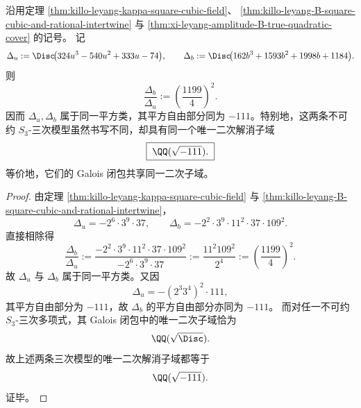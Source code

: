 \begin{corollary}[分支立方域与振幅平方立方域的共同二次解消子域与判别式平方比]\label{cor:xi-leyang-u-b-square-common-quadratic-resolvent}
沿用定理 \ref{thm:killo-leyang-kappa-square-cubic-field}、
\ref{thm:killo-leyang-B-square-cubic-and-rational-intertwine} 与
\ref{thm:xi-leyang-amplitude-B-true-quadratic-cover} 的记号。
记
\[
\Delta_u:=\Disc\!\bigl(324u^3-540u^2+333u-74\bigr),
\qquad
\Delta_b:=\Disc\!\bigl(162b^3+1593b^2+1998b+1184\bigr).
\]
则
\[
\frac{\Delta_b}{\Delta_u}
:=
\left(\frac{1199}{4}\right)^2.
\]
因而 \(\Delta_u,\Delta_b\) 属于同一平方类，其平方自由部分同为
\(-111\)。特别地，这两条不可约 \(S_3\)-三次模型虽然书写不同，却具有同一个唯一二次解消子域
\[
\boxed{\;
\QQ(\sqrt{-111}).\;}
\]
等价地，它们的 Galois 闭包共享同一二次子域。
\end{corollary}
\begin{proof}
由定理 \ref{thm:killo-leyang-kappa-square-cubic-field} 与
\ref{thm:killo-leyang-B-square-cubic-and-rational-intertwine}，
\[
\Delta_u=-2^{6}\cdot 3^{9}\cdot 37,
\qquad
\Delta_b=-2^{2}\cdot 3^{9}\cdot 11^{2}\cdot 37\cdot 109^{2}.
\]
直接相除得
\[
\frac{\Delta_b}{\Delta_u}
:=
\frac{-2^{2}\cdot 3^{9}\cdot 11^{2}\cdot 37\cdot 109^{2}}
{-2^{6}\cdot 3^{9}\cdot 37}
:=
\frac{11^{2}109^{2}}{2^{4}}
:=
\left(\frac{1199}{4}\right)^2.
\]
故 \(\Delta_u\) 与 \(\Delta_b\) 属于同一平方类。又因
\[
\Delta_u=-(2^3 3^4)^2\cdot 111,
\]
其平方自由部分为 \(-111\)，故 \(\Delta_b\) 的平方自由部分亦同为 \(-111\)。
而对任一不可约 \(S_3\)-三次多项式，其 Galois 闭包中的唯一二次子域恰为
\[
\QQ(\sqrt{\Disc}).
\]
故上述两条三次模型的唯一二次解消子域都等于
\[
\QQ(\sqrt{-111}).
\]
证毕。
\end{proof}
